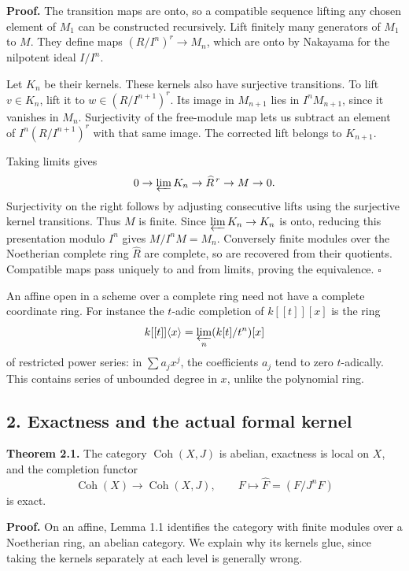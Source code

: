 \documentclass[11pt]{article}
\begin{document}
\textbf{Proof.} The transition maps are onto, so a compatible sequence
lifting any chosen element of \(M_1\) can be constructed recursively.
Lift finitely many generators of \(M_1\) to \(M\). They define maps
\((R/I^n)^r\to M_n\), which are onto by Nakayama for the nilpotent ideal
\(I/I^n\).

Let \(K_n\) be their kernels. These kernels also have surjective
transitions. To lift \(v\in K_n\), lift it to \(w\in(R/I^{n+1})^r\). Its
image in \(M_{n+1}\) lies in \(I^nM_{n+1}\), since it vanishes in
\(M_n\). Surjectivity of the free-module map lets us subtract an element
of \(I^n(R/I^{n+1})^r\) with that same image. The corrected lift belongs
to \(K_{n+1}\).

Taking limits gives \[
0\to\varprojlim K_n\to\widehat R^{\,r}\to M\to0.
\] Surjectivity on the right follows by adjusting consecutive lifts
using the surjective kernel transitions. Thus \(M\) is finite. Since
\(\varprojlim K_n\to K_n\) is onto, reducing this presentation modulo
\(I^n\) gives \(M/I^nM=M_n\). Conversely finite modules over the
Noetherian complete ring \(\widehat R\) are complete, so are recovered
from their quotients. Compatible maps pass uniquely to and from limits,
proving the equivalence. \(\square\)

An affine open in a scheme over a complete ring need not have a complete
coordinate ring. For instance the \(t\)-adic completion of \(k[[t]][x]\)
is the ring \[
k[[t]]\langle x\rangle=\varprojlim_n(k[t]/t^n)[x]
\] of restricted power series: in \(\sum a_jx^j\), the coefficients
\(a_j\) tend to zero \(t\)-adically. This contains series of unbounded
degree in \(x\), unlike the polynomial ring.

\subsection{2. Exactness and the actual formal
kernel}\label{exactness-and-the-actual-formal-kernel}

\textbf{Theorem 2.1.} The category \(\operatorname{Coh}(X,J)\) is
abelian, exactness is local on \(X\), and the completion functor \[
\operatorname{Coh}(X)\longrightarrow\operatorname{Coh}(X,J),
\qquad F\longmapsto\widehat F=(F/J^nF)
\] is exact.

\textbf{Proof.} On an affine, Lemma 1.1 identifies the category with
finite modules over a Noetherian ring, an abelian category. We explain
why its kernels glue, since taking the kernels separately at each level
is generally wrong.
\end{document}
